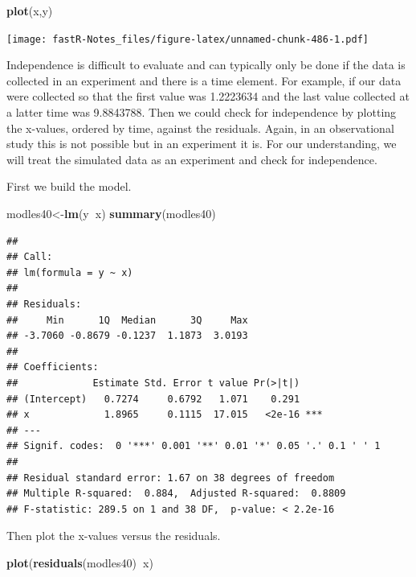 \documentclass[]{book}
\newenvironment{Shaded}{\begin{snugshade}}{\end{snugshade}}
\newcommand{\KeywordTok}[1]{\textcolor[rgb]{0.13,0.29,0.53}{\textbf{#1}}}
\newcommand{\OperatorTok}[1]{\textcolor[rgb]{0.81,0.36,0.00}{\textbf{#1}}}
\newcommand{\NormalTok}[1]{#1}
\theoremstyle{definition}
\theoremstyle{definition}
\theoremstyle{definition}
\theoremstyle{remark}
\begin{document}
\begin{Shaded}
\begin{Highlighting}[]
\KeywordTok{plot}\NormalTok{(x,y)}
\end{Highlighting}
\end{Shaded}

\texttt{[image: fastR-Notes\_files/figure-latex/unnamed-chunk-486-1.pdf]}

Independence is difficult to evaluate and can typically only be done if
the data is collected in an experiment and there is a time element. For
example, if our data were collected so that the first value was
1.2223634 and the last value collected at a latter time was 9.8843788.
Then we could check for independence by plotting the x-values, ordered
by time, against the residuals. Again, in an observational study this is
not possible but in an experiment it is. For our understanding, we will
treat the simulated data as an experiment and check for independence.

First we build the model.

\begin{Shaded}
\begin{Highlighting}[]
\NormalTok{modles40<-}\KeywordTok{lm}\NormalTok{(y}\OperatorTok{~}\NormalTok{x)}
\KeywordTok{summary}\NormalTok{(modles40)}
\end{Highlighting}
\end{Shaded}

\begin{verbatim}
## 
## Call:
## lm(formula = y ~ x)
## 
## Residuals:
##     Min      1Q  Median      3Q     Max 
## -3.7060 -0.8679 -0.1237  1.1873  3.0193 
## 
## Coefficients:
##             Estimate Std. Error t value Pr(>|t|)    
## (Intercept)   0.7274     0.6792   1.071    0.291    
## x             1.8965     0.1115  17.015   <2e-16 ***
## ---
## Signif. codes:  0 '***' 0.001 '**' 0.01 '*' 0.05 '.' 0.1 ' ' 1
## 
## Residual standard error: 1.67 on 38 degrees of freedom
## Multiple R-squared:  0.884,  Adjusted R-squared:  0.8809 
## F-statistic: 289.5 on 1 and 38 DF,  p-value: < 2.2e-16
\end{verbatim}

Then plot the x-values versus the residuals.

\begin{Shaded}
\begin{Highlighting}[]
\KeywordTok{plot}\NormalTok{(}\KeywordTok{residuals}\NormalTok{(modles40)}\OperatorTok{~}\NormalTok{x)}
\end{Highlighting}
\end{Shaded}
\end{document}
